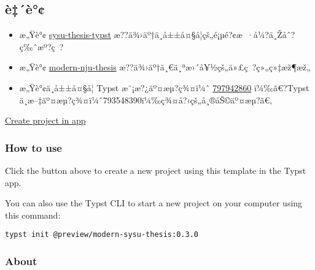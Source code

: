 \subsection{è‡´è°¢}\label{uxe8uxe8}

\begin{itemize}
\tightlist
\item
  æ„Ÿè°¢
  \href{https://github.com/howardlau1999/sysu-thesis-typst}{sysu-thesis-typst}
  æ??ä¾›äº†ä¸­å±±å¤§å­¦çš„é¡µé?¢æ~·å¼?ä¸Žåˆ?ç‰ˆæº?ç~?
\item
  æ„Ÿè°¢
  \href{https://typst.app/universe/package/modern-nju-thesis}{modern-nju-thesis}
  æ??ä¾›äº†ä¸€ä¸ªæ›´å¥½çš„ä»£ç~?ç»„ç»‡æž¶æž„
\item
  æ„Ÿè°¢ä¸­å±±å¤§å­¦ Typst æ¨¡æ?¿äº¤æµ?ç¾¤ï¼ˆ
  \href{https://jq.qq.com/?_wv=1027&k=m58va1kd}{797942860} ï¼‰ã€?Typst
  ä¸­æ--‡äº¤æµ?ç¾¤ï¼ˆ793548390ï¼‰ç¾¤å?‹çš„å¸®åŠ©äº¤æµ?ã€‚
\end{itemize}

\href{/app?template=modern-sysu-thesis&version=0.3.0}{Create project in
app}

\subsubsection{How to use}\label{how-to-use}

Click the button above to create a new project using this template in
the Typst app.

You can also use the Typst CLI to start a new project on your computer
using this command:

\begin{verbatim}
typst init @preview/modern-sysu-thesis:0.3.0
\end{verbatim}



\subsubsection{About}\label{about}

